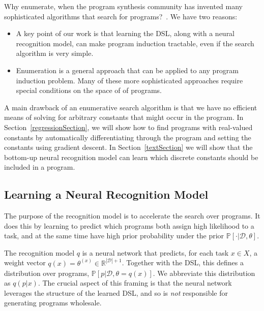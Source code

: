 \documentclass{article}
\newcommand{\probability}{\mathds{P}} %
\begin{document}
Why enumerate, when the program synthesis community has invented many
sophisticated algorithms that search for programs?~\cite{solar2008program,schkufza2013stochastic,feser2015synthesizing,osera2015type,polozov2015flashmeta}.
We have two reasons:%
\begin{itemize}
\item A key point of our work is that learning the DSL, along with a neural recognition model, can make program induction tractable, even if the search algorithm is very simple.
\item Enumeration is a general approach that can be applied to any program induction problem. Many of these more sophisticated approaches require special conditions on
  the space of of programs.
\end{itemize}
A main drawback of an enumerative search algorithm is that we have no
efficient means of solving for arbitrary constants that might occur in the
program. In Section~\ref{regressionSection},
we will show how to find programs with real-valued constants
by automatically differentiating through the program and setting the constants using gradient descent.
In Section~\ref{textSection}
we will show that the bottom-up neural recognition model can learn
which discrete constants should be included in a program.







\subsection{Learning a Neural Recognition Model}\label{recognitionSection}

The purpose of the recognition model is to accelerate the search over
programs.  It does this by learning to predict which programs both 
assign high likelihood to a task, and at the same time 
have high prior probability under the prior $\probability[\cdot |\mathcal{D},\theta]$.

The recognition model $q$ is a neural network that predicts,
for each task $x\in X$, a weight vector $q(x) = \theta^{(x)}\in \mathbb{R}^{|\mathcal{D}| + 1}$.
Together with the DSL, this defines a distribution over programs,
$\probability[p|\mathcal{D},\theta = q(x)]$.
We abbreviate this distribution as $q(p|x)$.
The crucial aspect of this framing is that the neural network
leverages the structure of the learned DSL,
and so is \emph{not} responsible for
generating programs wholesale.
\end{document}
